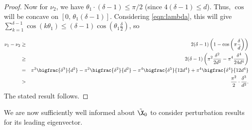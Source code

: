 \begin{proof}
Now for $\nu_2$, we have $\theta_1 \cdot (\delta - 1) \le \pi / 2$ (since $4(\delta - 1) \le d$). Thus, $\cos$ will be concave on $[0,\, \theta_1(\delta-1)]$.  Considering \eqref{eqn:lambda}, this will give $\sum_{k=1}^{\delta - 1}\cos(k\theta_1) \le (\delta - 1) \cos \left(\theta_1 \frac{\delta}{2} \right)$, so

\begin{eqnarray*}
  \nu_1 - \nu_2 & \ge & 2(\delta - 1) \left(1 - \cos \left(\pi\frac{\delta}{d} \right) \right)\\
  & \ge & 2(\delta - 1) \left(\pi^2\frac{\delta^2}{2d^2} - \pi^4\frac{\delta^4}{24d^4} \right) \\
  & = & \pi^2\bigfrac{\delta^3}{d^2} - \pi^2\bigfrac{\delta^2}{d^2} -\pi^4\bigfrac{\delta^5}{12d^4} + \pi^4\bigfrac{\delta^4}{12d^4} \\
  & > & \frac{\pi^2}{2} \cdot \frac{\delta^3}{d^2} .
\end{eqnarray*}
The stated result follows.  %
\end{proof}

We are now sufficiently well informed about $\tilde{\X}_0$ to consider perturbation results for its leading eigenvector.
